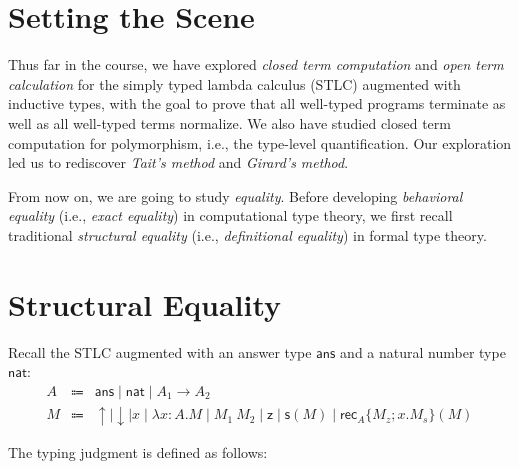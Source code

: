 \documentclass{article}
\newcommand{\G}{\Gamma}
\newcommand{\entails}{\vdash}
\newcommand{\eapp}[2]{#1~#2}
\newcommand{\eabs}[3]{\lambda #1:#2.#3}
\newcommand{\tans}{\mathsf{ans}}
\newcommand{\tnat}{\mathsf{nat}}
\newcommand{\eacc}{\uparrow}
\newcommand{\erej}{\downarrow}
\newcommand{\ez}{\mathsf{z}}
\newcommand{\es}[1]{\mathsf{s}(#1)}
\newcommand{\erec}[5]{\mathsf{rec}_{#1}\{#2;#3.#4\}(#5)}
\begin{document}
\maketitle

\section{Setting the Scene}

Thus far in the course, we have explored \emph{closed term computation} and \emph{open term calculation} for the simply typed lambda calculus (STLC) augmented with inductive types, with the goal to prove that all well-typed programs terminate as well as all well-typed terms normalize.
We also have studied closed term computation for polymorphism, i.e., the type-level quantification.
Our exploration led us to rediscover \emph{Tait's method} and \emph{Girard's method}.

From now on, we are going to study \emph{equality}.
Before developing \emph{behavioral equality} (i.e., \emph{exact equality}) in computational type theory, we first recall traditional \emph{structural equality} (i.e., \emph{definitional equality}) in formal type theory.

\section{Structural Equality}

Recall the STLC augmented with an answer type $\tans$ and a natural number type $\tnat$:
\[
\begin{array}{rcl}
A & \Coloneqq & \tans \mid \tnat \mid A_1 \to A_2 \\
M & \Coloneqq & {\eacc} \mid {\erej} \mid x \mid \eabs{x}{A}{M} \mid \eapp{M_1}{M_2} \mid \ez \mid \es{M} \mid \erec{A}{M_z}{x}{M_s}{M}
\end{array}
\]

The typing judgment is defined as follows:
\end{document}
